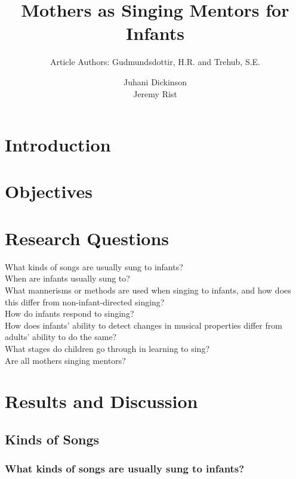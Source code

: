 \documentclass{beamer}
\title{Mothers as Singing Mentors for Infants}
\subtitle{Article Authors: Gudmundsdottir, H.R. and Trehub, S.E.}
\author[Juhani Dickinson, Jeremy Rist]{Juhani Dickinson \\ Jeremy Rist}
\begin{document}
\begin{frame}
	\titlepage
\end{frame}


\section{Introduction}
\begin{frame}
\end{frame}

\section{Objectives}
\begin{frame}
\end{frame}

\section{Research Questions}
\begin{frame}
	What kinds of songs are usually sung to infants?\\
	When are infants usually sung to?\\
	What mannerisms or methods are used when singing to infants, and how does this differ from non-infant-directed singing?\\
	How do infants respond to singing?\\
	How does infants' ability to detect changes in musical properties differ from adults' ability to do the same?\\ %
	What stages do children go through in learning to sing?\\
	Are all mothers singing mentors?
\end{frame}

\section{Results and Discussion}
\subsection*{Kinds of Songs}
\begin{frame}
	\frametitle{What kinds of songs are usually sung to infants?}
\end{frame}
\end{document}
